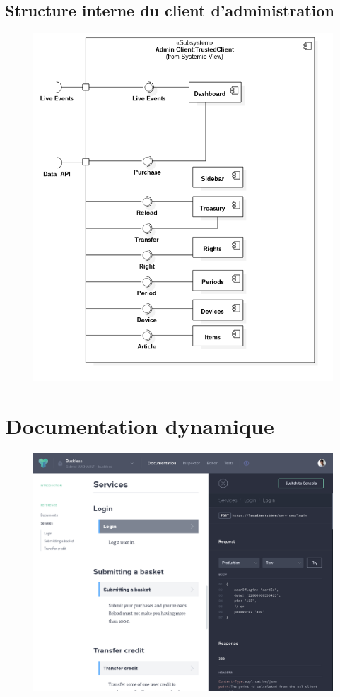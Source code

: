 \newpage
\subsection{Structure interne du client d'administration}
    \begin{figure}[h]
        \centering
        \includegraphics[scale=0.55]{./assets/UML/admin_client.png}
        \label{admin_client}
    \end{figure}

\newpage
\section{Documentation dynamique}
\label{apiary}
    \begin{figure}[h]
        \centering
        \includegraphics[width=\textwidth]{./assets/apiary.png}
    \end{figure}